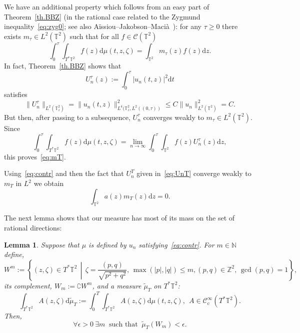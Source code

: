 \documentclass[11pt]{article}
\newtheorem{lemm}[theo]{Lemma}
\theoremstyle{definition}
\numberwithin{equation}{section}
\numberwithin{figure}{section}
\numberwithin{table}{section}
\newcommand{\CIc}{{\mathcal C}^\infty_{\mathrm{c}} }
\newcommand{\NN}{{\mathbb N}}
\newcommand{\TT}{{\mathbb T}}
\newcommand*\Z{\mathbb Z}
\newcommand*{\dd}{\mathrm{d}}
\newcommand*{\dz}{\dd z}
\newcommand*{\dt}{\dd t}
\newcommand*{\dmu}{\dd \mu}
\newcommand*{\dwmu}{\dd \widetilde\mu}
\let\oldexists\exists
\renewcommand*{\exists}{\mathrel{\oldexists}}
\let\oldforall\forall
\renewcommand*{\forall}{\mathrel{\oldforall}}
\newcommand*{\Tq}{\,\middle|\,}
\begin{document}
We have an additional property which follows from an easy part of Theorem~\ref{th.BBZ} (in the rational case related to the Zygmund inequality~\eqref{eq:zyg0}; see also Aïssiou--Jakobson--Macià~\cite[Theorem~1.2]{AJM}): for any $ \tau \geq 0 $ there exists $ m_\tau
\in L^2 (\TT^2) $ such that for all $ f \in \mathcal C (\TT^2) $
\begin{equation}\label{eq:mT}
\int_{0}^\tau \!\!\int_{ T^* \TT^2 } f (z) \dmu (t, z, \zeta) =
\int_{\TT^2 } m_\tau (z) f (z) \dz.
\end{equation}
In fact, Theorem~\ref{th.BBZ} shows that
\begin{equation}\label{eq:UnT}
U_n^\tau (z) := \int_{0}^\tau | u_n (t, z) |^2 \dt
\end{equation}
satisfies
\begin{equation}\label{eq:prop22}
\| U^\tau_n \|_{ L^2 (\TT^2_z) } = \| u_n (t, z) \|_{ L^4 (\TT^2_z, L^2 ((0, \tau)) }^2 \leq C \| u_n \|_{L^2 (\TT^2) }^2 = C.
\end{equation}
But then, after passing to a subsequence, $ U_n^\tau $ converges weakly to $ m_\tau \in L^2 (\TT^2) $. Since
\[
\int_{0}^\tau \int_{ T^* \TT^2 } f (z) \dmu (t, z, \zeta) = \lim_{ n \to \infty } \int_{0}^\tau \int_{\TT^2} f (z) U_n^\tau (z) \dz,
\]
this proves~\eqref{eq:mT}.

Using~\eqref{eq:contr} and then the fact that $ U_n^T $ given in~\eqref{eq:UnT} converge weakly to $ m_T $ in $ L^2$ we obtain
\begin{equation}\label{eq:l1}
\int_{\TT^2 } a (z) m_T (z) \dz = 0.
\end{equation}

The next lemma shows that our measure has most of its mass on the set of rational directions:

\begin{lemm}\label{l:2}
Suppose that $\mu $ is defined by $ u_n$ satisfying~\eqref{eq:contr}. For $ m \in \NN $ define,
\[
W^m \!:=\! \left\{ (z, \zeta) \in T^* \TT^2 \Tq \zeta = \frac{ (p, q) }{
\sqrt{ p^2 + q^2 }}, \, \max(|p|, |q|) \leq m, (p, q) \in \Z^2, \, \gcd(p,q) = 1 \right\}\!,
\]
its complement, $ W_m := \complement W^m $, and a measure $ \widetilde \mu_T $ on $ T^* \TT^2 $:
\begin{equation}\label{eq:defwm}
\int_{T^* \TT^2} A (z, \zeta) \dwmu_T := \int_0^T \int_{T^* \TT^2 } A (z, \zeta) \dmu (t, z, \zeta), \ \ A \in \CIc (T^* \TT^2).
\end{equation}
Then,
\begin{equation}\label{eq:l2}
\forall \epsilon > 0 \ \exists m \ \text{ such that } \
\widetilde \mu_T (W_m) < \epsilon.
\end{equation}
\end{lemm}
\end{document}

